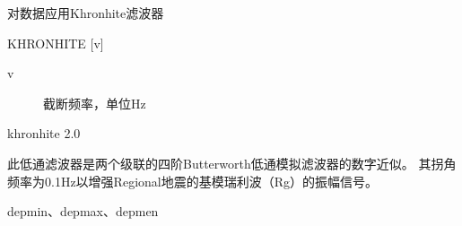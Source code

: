 \label{cmd:khronhite}

对数据应用Khronhite滤波器

\begin{SACSTX}
KHRONHITE [v]
\end{SACSTX}

\begin{description}
\item [v] 截断频率，单位Hz
\end{description}

\begin{SACDFT}
khronhite 2.0
\end{SACDFT}

此低通滤波器是两个级联的四阶Butterworth低通模拟滤波器的数字近似。
其拐角频率为0.1Hz以增强Regional地震的基模瑞利波（Rg）的振幅信号。

depmin、depmax、depmen
